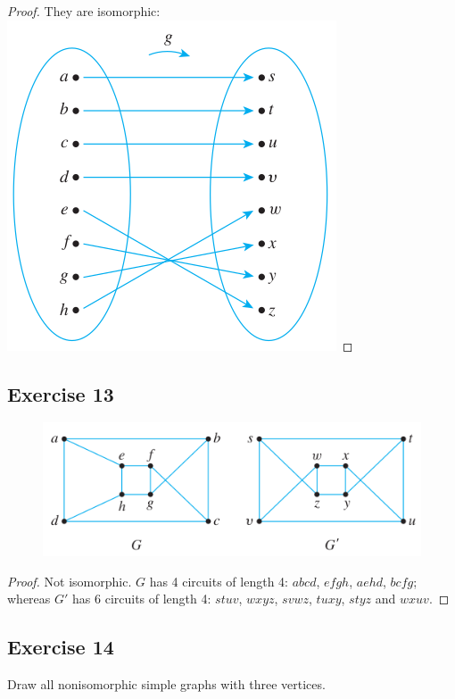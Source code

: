 \documentclass[14pt]{extarticle}
\begin{document}
\begin{proof}
    They are isomorphic:
    \includegraphics[scale=0.4]{../images/10.3.12.1.png}
\end{proof}

\subsection{Exercise 13}
\begin{figure}[ht!]
    \centering
    \includegraphics[scale=0.5]{../images/10.3.13.png}
\end{figure}

\begin{proof}
    Not isomorphic. \(G\) has 4 circuits of length 4: \(abcd\), \(efgh\), \(aehd\), \(bcfg\); whereas \(G'\) has 6 circuits of
    length 4: \(stuv\), \(wxyz\), \(svwz\), \(tuxy\), \(styz\) and \(wxuv\).
\end{proof}

\subsection{Exercise 14}
Draw all nonisomorphic simple graphs with three vertices.
\end{document}
